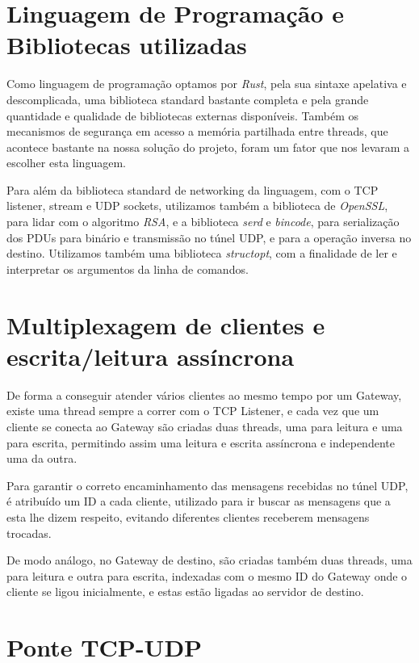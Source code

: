 \documentclass[a4paper]{report}
\begin{document}
\section{Linguagem de Programação e Bibliotecas utilizadas}

Como linguagem de programação optamos por \textit{Rust}, pela sua sintaxe
apelativa e descomplicada, uma biblioteca standard bastante completa e pela
grande quantidade e qualidade de bibliotecas externas disponíveis. Também
os mecanismos de segurança em acesso a memória partilhada entre threads,
que acontece bastante na nossa solução do projeto, foram um fator que nos
levaram a escolher esta linguagem.

Para além da biblioteca standard de networking da linguagem, com o TCP
listener, stream e UDP sockets, utilizamos também a biblioteca de 
\textit{OpenSSL}, para lidar com o algoritmo \textit{RSA}, e a biblioteca
\textit{serd} e \textit{bincode}, para serialização dos PDUs para binário
e transmissão no túnel UDP, e para a operação inversa no destino. Utilizamos
também uma biblioteca \textit{structopt}, com a finalidade de ler e interpretar 
os argumentos da linha de comandos.

\section{Multiplexagem de clientes e escrita/leitura assíncrona}

De forma a conseguir atender vários clientes ao mesmo tempo por um Gateway,
existe uma thread sempre a correr com o TCP Listener, e cada vez que um cliente
se conecta ao Gateway são criadas duas threads, uma para leitura e uma para
escrita, permitindo assim uma leitura e escrita assíncrona e independente uma
da outra. 

Para garantir o correto encaminhamento das mensagens recebidas no 
túnel UDP, é atribuído um ID a cada cliente, utilizado para ir buscar
as mensagens que a esta lhe dizem respeito, evitando diferentes clientes
receberem mensagens trocadas.

De modo análogo, no Gateway de destino, são criadas também duas threads,
uma para leitura e outra para escrita, indexadas com o mesmo ID do Gateway 
onde o cliente se ligou inicialmente, e estas estão ligadas ao servidor 
de destino.

\section{Ponte TCP-UDP} \label{sec:tcp}
\end{document}
